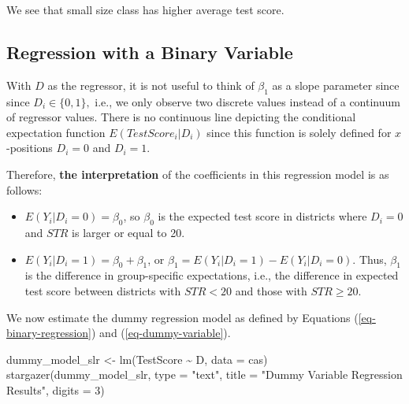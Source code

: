 \documentclass[
  12pt,
  letterpaper,
]{scrbook}
\newenvironment{Shaded}{\begin{snugshade}}{\end{snugshade}}
\newcommand{\AttributeTok}[1]{\textcolor[rgb]{0.40,0.45,0.13}{#1}}
\newcommand{\DecValTok}[1]{\textcolor[rgb]{0.68,0.00,0.00}{#1}}
\newcommand{\FunctionTok}[1]{\textcolor[rgb]{0.28,0.35,0.67}{#1}}
\newcommand{\NormalTok}[1]{\textcolor[rgb]{0.00,0.23,0.31}{#1}}
\newcommand{\OtherTok}[1]{\textcolor[rgb]{0.00,0.23,0.31}{#1}}
\newcommand{\SpecialCharTok}[1]{\textcolor[rgb]{0.37,0.37,0.37}{#1}}
\newcommand{\StringTok}[1]{\textcolor[rgb]{0.13,0.47,0.30}{#1}}
\providecommand{\tightlist}{%
  \setlength{\itemsep}{0pt}\setlength{\parskip}{0pt}}
\renewcommand{\tightlist}{\setlength{\itemsep}{0.5\baselineskip}\setlength{\parskip}{0.2\baselineskip}}
\theoremstyle{plain}
\theoremstyle{definition}
\theoremstyle{remark}
\begin{document}
We see that small size class has higher average test score.

\subsection{Regression with a Binary
Variable}\label{regression-with-a-binary-variable}

With \(D\) as the regressor, it is not useful to think of \(\beta_1\) as
a slope parameter since since \(D_i \in \{0,1\},\) i.e., we only observe
two discrete values instead of a continuum of regressor values. There is
no continuous line depicting the conditional expectation function
\(E(TestScore_i | D_i)\) since this function is solely defined for
\(x\)-positions \(D_i = 0\) and \(D_i = 1\).

Therefore, {\textbf{the interpretation}} of the coefficients in this
regression model is as follows:

\begin{itemize}
\tightlist
\item
  \(E(Y_i | D_i = 0) = \beta_0\), so \(\beta_0\) is the expected test
  score in districts where \(D_i = 0\) and \(STR\) is larger or equal to
  20.
\item
  \(E(Y_i | D_i = 1) = \beta_0 + \beta_1\), or
  \(\beta_1 = E(Y_i | D_i = 1) - E(Y_i | D_i = 0).\) Thus, \(\beta_1\)
  is the difference in group-specific expectations, i.e., the difference
  in expected test score between districts with \(STR<20\) and those
  with \(STR \geq 20.\)
\end{itemize}

We now estimate the dummy regression model as defined by Equations
(\ref{eq-binary-regression}) and (\ref{eq-dummy-variable}).

\begin{Shaded}
\begin{Highlighting}[]
\NormalTok{dummy\_model\_slr }\OtherTok{\textless{}{-}} \FunctionTok{lm}\NormalTok{(TestScore }\SpecialCharTok{\textasciitilde{}}\NormalTok{ D, }\AttributeTok{data =}\NormalTok{ cas)}
\FunctionTok{stargazer}\NormalTok{(dummy\_model\_slr, }\AttributeTok{type =} \StringTok{"text"}\NormalTok{, }\AttributeTok{title =} \StringTok{"Dummy Variable Regression Results"}\NormalTok{, }\AttributeTok{digits =} \DecValTok{3}\NormalTok{)}
\end{Highlighting}
\end{Shaded}
\end{document}
